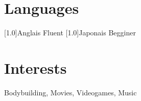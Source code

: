 \documentclass[english]{cv-style}          %
\begin{document}
\section{Languages}
\begin{entrylist}
  \vspace{0.2cm}
  \entry
    {\scalebox{.8}[1.0]{Anglais}}
    {Fluent}
    {}
    {}
  \entry
    {\scalebox{.8}[1.0]{Japonais}}
    {Begginer}
    {}
    {}
   
\end{entrylist}

\section{Interests}
\textbf{}{Bodybuilding, Movies, Videogames, Music}
\end{document}
